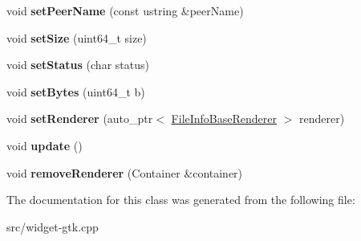 \begin{DoxyCompactItemize}
\item 
\hypertarget{classFileInfoItem_a3a3369adea5085b8d73bdf0914d70ec1}{void {\bfseries set\-Peer\-Name} (const ustring \&peer\-Name)}\label{classFileInfoItem_a3a3369adea5085b8d73bdf0914d70ec1}

\item 
\hypertarget{classFileInfoItem_a2a06a9fbf9df17c4fbd37c7b870d4d4e}{void {\bfseries set\-Size} (uint64\-\_\-t size)}\label{classFileInfoItem_a2a06a9fbf9df17c4fbd37c7b870d4d4e}

\item 
\hypertarget{classFileInfoItem_aebe630cf4ec8725e1985bedd76b99c36}{void {\bfseries set\-Status} (char status)}\label{classFileInfoItem_aebe630cf4ec8725e1985bedd76b99c36}

\item 
\hypertarget{classFileInfoItem_a99b31cc69f12b84ae13860923f2dcbf8}{void {\bfseries set\-Bytes} (uint64\-\_\-t b)}\label{classFileInfoItem_a99b31cc69f12b84ae13860923f2dcbf8}

\item 
\hypertarget{classFileInfoItem_ac43c9835a262ab18a6ef8705c28aaccf}{void {\bfseries set\-Renderer} (auto\-\_\-ptr$<$ \hyperlink{classFileInfoBaseRenderer}{\-File\-Info\-Base\-Renderer} $>$ renderer)}\label{classFileInfoItem_ac43c9835a262ab18a6ef8705c28aaccf}

\item 
\hypertarget{classFileInfoItem_a86e97d0058351f7315f1856621fa8aa7}{void {\bfseries update} ()}\label{classFileInfoItem_a86e97d0058351f7315f1856621fa8aa7}

\item 
\hypertarget{classFileInfoItem_a86c0e6ab33762208cf82757260dd86a7}{void {\bfseries remove\-Renderer} (\-Container \&container)}\label{classFileInfoItem_a86c0e6ab33762208cf82757260dd86a7}

\end{DoxyCompactItemize}


\-The documentation for this class was generated from the following file\-:\begin{DoxyCompactItemize}
\item 
src/widget-\/gtk.\-cpp\end{DoxyCompactItemize}
